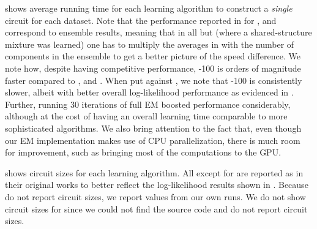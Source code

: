  shows average running time for each learning algorithm to construct a
\emph{single} circuit for each dataset. Note that the performance reported in  for
,  and  correspond to ensemble results, meaning
that in all but  (where a shared-structure mixture was learned) one has to
multiply the averages in  with the number of components in the ensemble to get a
better picture of the speed difference. We note how, despite having competitive performance,
-100 is orders of magnitude faster compared to ,
 and . When put against , we note that
-100 is consistently slower, albeit with better overall log-likelihood
performance as evidenced in . Further, running 30 iterations of full EM boosted
performance considerably, although at the cost of having an overall learning time comparable to
more sophisticated algorithms. We also bring attention to the fact that, even though our EM
implementation makes use of CPU parallelization, there is much room for improvement, such as
bringing most of the computations to the GPU.

 shows circuit sizes for each learning algorithm. All except for
 are reported as in their original works to better reflect the log-likelihood
results shown in . Because \citet{gens13} do not report circuit sizes, we report
values from our own runs. We do not show circuit sizes for  since we could not
find the source code and \citet{jaini18a} do not report circuit sizes.


